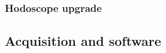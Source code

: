 \subsubsection{Hodoscope upgrade}\label{chap3::subsubsec::hodoUpgrade} 

\subsection{Acquisition and software}\label{chap3::subsec::daqNext}





\clearpage
